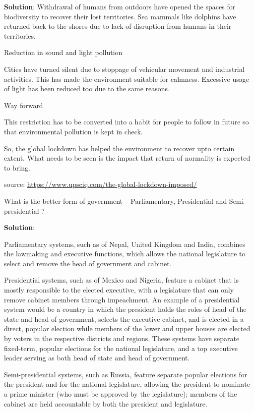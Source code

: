 \documentclass[
  openany]{book}
\newcommand{\question}{\item}
\newenvironment{solution}{ {\bfseries Solution}:}{}
\begin{document}
\begin{questions}
\begin{solution}
Withdrawal of humans from outdoors have opened the spaces for biodiversity to recover their lost territories. Sea mammals like dolphins have returned back to the shores due to lack of disruption from humans in their territories.

Reduction in sound and light pollution

Cities have turned silent due to stoppage of vehicular movement and industrial activities. This has made the environment suitable for calmness. Excessive usage of light has been reduced too due to the same reasons.

Way forward

This restriction has to be converted into a habit for people to follow in future so that environmental pollution is kept in check.

So, the global lockdown has helped the environment to recover upto certain extent. What needs to be seen is the impact that return of normality is expected to bring.

source: \url{https://www.upsciq.com/the-global-lockdown-imposed/}
\end{solution}

\question What is the better form of government -- Parliamentary, Presidential and Semi-presidential ?

\begin{solution}

Parliamentary systems, such as of Nepal, United Kingdom and India, combines the lawmaking and executive functions, which allows the national legislature to select and remove the head of government and cabinet.

Presidential systems, such as of Mexico and Nigeria, feature a cabinet that is mostly responsible to the elected executive, with a legislature that can only remove cabinet members through impeachment. An example of a presidential system would be a country in which the president holds the roles of head of the state and head of government, selects the executive cabinet, and is elected in a direct, popular election while members of the lower and upper houses are elected by voters in the respective districts and regions. These systems have separate fixed-term, popular elections for the national legislature, and a top executive leader serving as both head of state and head of government.

Semi-presidential systems, such as Russia, feature separate popular elections for the president and for the national legislature, allowing the president to nominate a prime minister (who must be approved by the legislature); members of the cabinet are held accountable by both the president and legislature.


\end{solution}
\end{questions}
\end{document}

